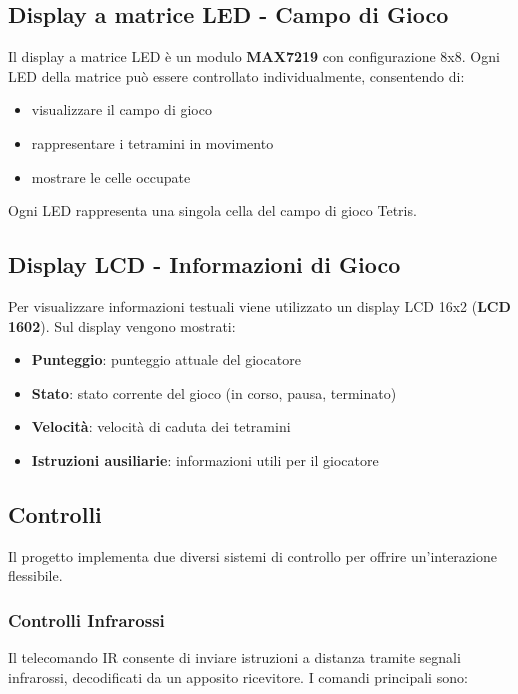 \documentclass[a4paper, 12pt]{article}
\begin{document}
\subsection{Display a matrice LED - Campo di Gioco}
\label{subsec:display-matrice}
Il display a matrice LED è un modulo \textbf{MAX7219} con configurazione 8x8. Ogni LED della matrice può essere controllato individualmente, consentendo di:
\begin{itemize}
    \item visualizzare il campo di gioco
    \item rappresentare i tetramini in movimento
    \item mostrare le celle occupate
\end{itemize}

Ogni LED rappresenta una singola cella del campo di gioco Tetris.

\subsection{Display LCD - Informazioni di Gioco}
\label{subsec:display-lcd}
Per visualizzare informazioni testuali viene utilizzato un display LCD 16x2 (\textbf{LCD 1602}). Sul display vengono mostrati:
\begin{itemize}
    \item \textbf{Punteggio}: punteggio attuale del giocatore
    \item \textbf{Stato}: stato corrente del gioco (in corso, pausa, terminato)
    \item \textbf{Velocità}: velocità di caduta dei tetramini
    \item \textbf{Istruzioni ausiliarie}: informazioni utili per il giocatore
\end{itemize}

\subsection{Controlli}
\label{subsec:controlli}
Il progetto implementa due diversi sistemi di controllo per offrire un'interazione flessibile.

\subsubsection{Controlli Infrarossi}
\label{subsubsec:controlli-ir}
Il telecomando IR consente di inviare istruzioni a distanza tramite segnali infrarossi, decodificati da un apposito ricevitore. I comandi principali sono:
\end{document}
